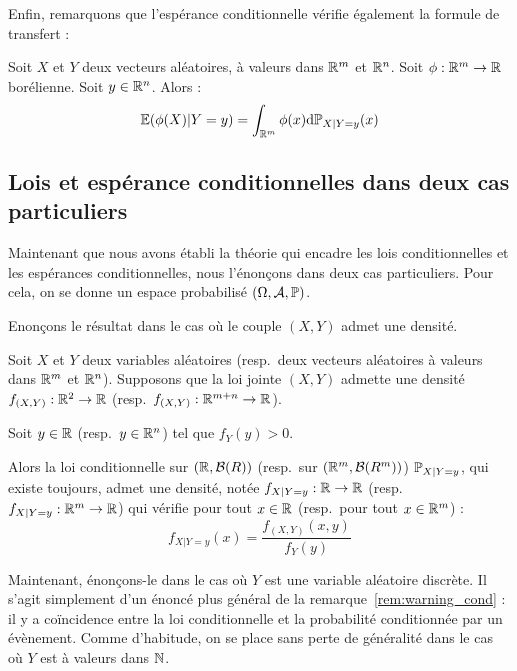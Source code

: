 \documentclass[../integ-proba.tex]{subfiles}
\begin{document}
    Enfin, remarquons que l'espérance conditionnelle vérifie également la formule de transfert :

    \begin{thm}
        Soit $X$ et $Y$ deux vecteurs aléatoires, à valeurs dans $\mathbb{R}^m$ et $\mathbb{R}^n$.
        Soit $\phi:\mathbb{R}^m \rightarrow \mathbb{R}$ borélienne.
        Soit $y \in \mathbb{R}^n$.
        Alors :
        \begin{displaymath}
            \mathbb{E}( \phi(X) | Y = y) = \int_{\mathbb{R}^m} \phi(x) \textnormal{d}\mathbb{P}_{X | Y = y}(x)
        \end{displaymath}
    \end{thm}

    \subsection{Lois et espérance conditionnelles dans deux cas particuliers}

    Maintenant que nous avons établi la théorie qui encadre les lois conditionnelles et les espérances conditionnelles, nous l'énonçons dans deux cas particuliers.
    Pour cela, on se donne un espace probabilisé $\left( \Omega, \mathcal{A}, \mathbb{P} \right)$.

    Enonçons le résultat dans le cas où le couple $\left( X, Y \right)$ admet une densité.

    \begin{thm}
        Soit $X$ et $Y$ deux variables aléatoires (resp.\ deux vecteurs aléatoires à valeurs dans $\mathbb{R}^m$ et $\mathbb{R}^n$).
        Supposons que la loi jointe $\left( X, Y \right)$ admette une densité $f_{\left( X, Y \right)}: \mathbb{R}^2 \rightarrow \mathbb{R}$ (resp.\ $f_{\left( X, Y \right)}: \mathbb{R}^{m+n} \rightarrow \mathbb{R}$).

        Soit $y \in \mathbb{R}$ (resp.\ $y \in \mathbb{R}^n$) tel que $f_Y(y) > 0$.

        Alors la loi conditionnelle sur $\left( \mathbb{R}, \mathcal{B}(R) \right)$ (resp.\ sur $\left( \mathbb{R}^m, \mathcal{B}(R^m) \right)$) $\mathbb{P}_{X | Y = y}$, qui existe toujours, admet une densité, notée $f_{X | Y=y} : \mathbb{R} \rightarrow \mathbb{R}$ (resp.\ $f_{X | Y=y} : \mathbb{R}^m \rightarrow \mathbb{R}$) qui vérifie pour tout $x \in \mathbb{R}$ (resp.\ pour tout $x \in \mathbb{R}^m$) :
        \begin{displaymath}
            f_{X | Y = y}(x) = \dfrac{f_{\left( X, Y \right)}(x,y)}{f_Y(y)}
        \end{displaymath}
    \end{thm}

    Maintenant, énonçons-le dans le cas où $Y$ est une variable aléatoire discrète.
    Il s'agit simplement d'un énoncé plus général de la remarque~\ref{rem:warning_cond} : il y a coïncidence entre la loi conditionnelle et la probabilité conditionnée par un évènement.
    Comme d'habitude, on se place sans perte de généralité dans le cas où $Y$ est à valeurs dans $\mathbb{N}$.
\end{document}
